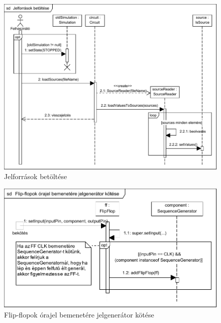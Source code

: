 \begin{figure}[H]
\begin{center}
\includegraphics[angle=90]{chapters/chapter03/seqdiagrams/jelforrasok_betoltese.pdf}
\caption{Jelforrások betöltése}
\label{fig:jelforrasok_betoltese}
\end{center}
\end{figure}

\begin{figure}[H]
\begin{center}
\includegraphics{chapters/chapter03/seqdiagrams/ff_bind.pdf}
\caption{Flip-flopok órajel bemenetére jelgenerátor kötése}
\label{fig:ff_bind}
\end{center}
\end{figure}

